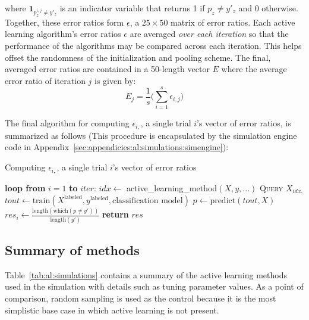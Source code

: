 \noindent where $\textbf{1}_{p^{i,j}_z \neq y'_z}$ is an indicator variable 
that returns 1 if $p_z \neq y'_z$ and 0 otherwise. Together, these error ratios 
form $\epsilon$, a $25\times 50$ matrix of error ratios. Each active learning
algorithm's error ratios $\epsilon$ are averaged \textit{over each iteration} 
so that the performance of the algorithms may be compared across each 
iteration. This helps offset the randomness of the initialization and pooling 
scheme. The final, averaged error ratios are contained in a 50-length vector 
$E$ where the average error ratio of iteration $j$ is given by:
$$E_{j} = \frac{1}{s} \bigg( \sum\limits_{i=1}^{s} \epsilon_{i,j} \bigg)$$

The final algorithm for computing $\epsilon_{i,}$, a single trial $i$'s vector 
of error ratios, is summarized as follows (This procedure is encapsulated by 
the simulation engine code in 
Appendix~\ref{sec:appendicies:al:simulations:simengine}):

\tablespacing
\begin{algorithm}[H]
	\caption{Computing $\epsilon_{i,}$, a single trial $i$'s vector of error 
	ratios}\label{alg:al:simulation:evaluation}
	\begin{algorithmic}[1]
		\State \textbf{loop from} $i=1$ \textbf{to} $iter$:
		\State \indent $idx \gets $ active\_learning\_method$(X,y,...)$
		\State \indent \textsc{Query} $X_{idx,}$
		\State \indent $tout \gets 
		\text{train}(X^{\text{labeled}},y^{\text{labeled}},\text{classification 
		model})$
		\State \indent $p \gets \text{predict}(tout,X)$
		\State \indent $res_i\gets \frac{\text{length}(\text{which}(p \neq y'))}
		{\text{length}(y')}$
		\State \textbf{return} $res$
		\EndProcedure
	\end{algorithmic}
\end{algorithm}
\bodyspacing

\subsection{Summary of methods}
\label{sec:al:simulation:methods}

Table~\ref{tab:al:simulations} contains a summary of the active learning 
methods used in the simulation with details such as tuning parameter values. 
As a point of comparison, random sampling is used as the control because it is 
the most simplistic base case in which active learning is not present.

